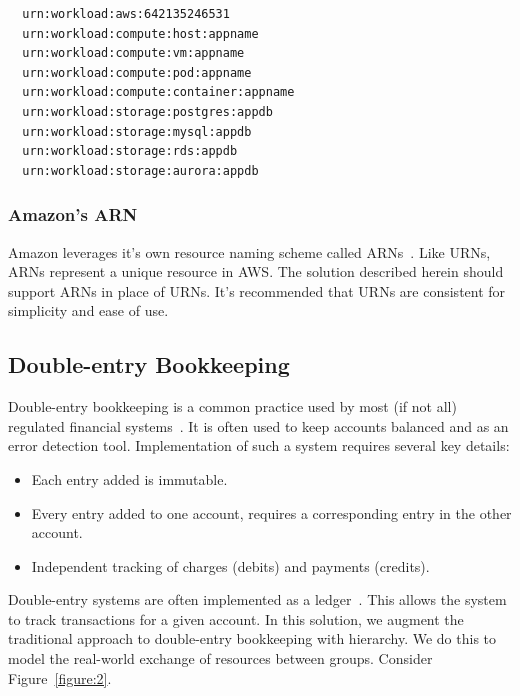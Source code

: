 \documentclass[10pt, a4paper, twocolumn]{article}
\begin{document}
\begin{verbatim}
  urn:workload:aws:642135246531
  urn:workload:compute:host:appname
  urn:workload:compute:vm:appname
  urn:workload:compute:pod:appname
  urn:workload:compute:container:appname
  urn:workload:storage:postgres:appdb
  urn:workload:storage:mysql:appdb
  urn:workload:storage:rds:appdb
  urn:workload:storage:aurora:appdb
\end{verbatim}

    \subsubsection*{Amazon's ARN}
      Amazon leverages it's own resource naming scheme called ARNs~\cite{awsarn}.
      Like URNs, ARNs represent a unique resource in AWS.
      The solution described herein should support ARNs in place of URNs.
      It's recommended that URNs are consistent for simplicity and ease of use.

  \subsection*{Double-entry Bookkeeping}
    Double-entry bookkeeping is a common practice used by most (if not all) regulated financial systems~\cite{doubleentry2}.
    It is often used to keep accounts balanced and as an error detection tool.
    Implementation of such a system requires several key details:

    \begin{itemize}
      \item Each entry added is immutable.
      \item Every entry added to one account, requires a corresponding entry in the other account.
      \item Independent tracking of charges (debits) and payments (credits).
    \end{itemize}

    Double-entry systems are often implemented as a ledger~\cite{doubleentry}.
    This allows the system to track transactions for a given account.
    In this solution, we augment the traditional approach to double-entry bookkeeping with hierarchy.
    We do this to model the real-world exchange of resources between groups.
    Consider Figure~\ref{figure:2}.
\end{document}
